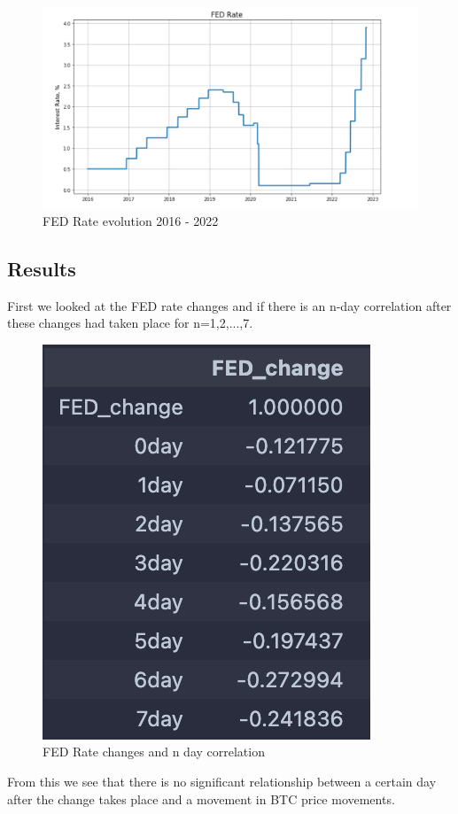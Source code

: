 \documentclass[12pt]{article}
\begin{document}
\begin{figure}[!htb]
   \includegraphics[scale=0.7]{research_project/text/paper/FED rate graph.png}
   \centering
   \caption{FED Rate evolution 2016 - 2022}
   \label{fig:FED Rate evolution 2016 - 2022}
\end{figure}


\subsection{Results}
First we looked at the FED rate changes and if there is an n-day correlation after these changes had taken place for n=1,2,...,7.
\begin{figure}[H]
   \includegraphics[scale=0.7]{research_project/text/paper/1.png}
   \centering
   \caption{FED Rate changes and n day correlation}
   \label{fig:FED Rate evolution 2016 - 2022}
\end{figure}
From this we see that there is no significant relationship between a certain day after the change takes place and a movement in BTC price movements.\\
\end{document}
